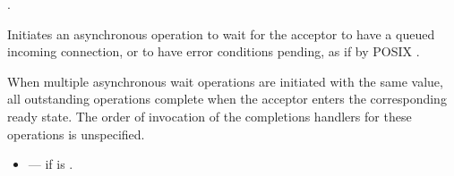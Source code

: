 \begin{itemdescr}
\pnum
\completionsig {}.

\pnum
\effects Initiates an asynchronous operation to wait for the acceptor to have a queued incoming connection, or to have error conditions pending, as if by POSIX .

\pnum
When multiple asynchronous wait operations are initiated with the same  value, all outstanding operations complete when the acceptor enters the corresponding ready state. The order of invocation of the completions handlers for these operations is unspecified.

\pnum
\errors
\begin{itemize}
\item
{} --- if  is .
\end{itemize}
\end{itemdescr}




